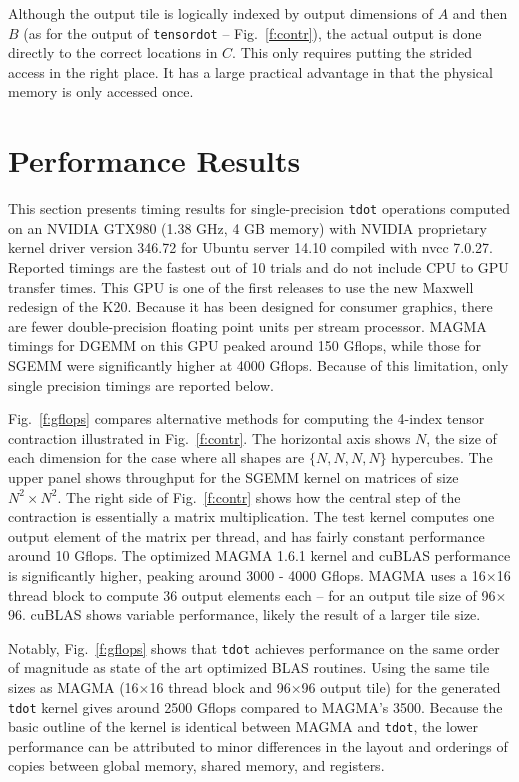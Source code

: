 \documentclass[preprint]{sigplanconf}
\begin{document}
  Although the output tile is logically indexed by output dimensions of
$A$ and then $B$ (as for the output of {\tt tensordot} -- Fig.~\ref{f:contr}),
the actual output is done directly to the correct locations in $C$.
This only requires putting the strided access in the right place.
It has a large practical advantage in that the physical
memory is only accessed once.

\section{ Performance Results}\label{s:perf}

  This section presents timing results for single-precision {\tt tdot} operations computed
on an NVIDIA GTX980 (1.38 GHz, 4 GB memory) with NVIDIA proprietary
kernel driver version 346.72 for Ubuntu server 14.10 compiled with nvcc 7.0.27.  Reported timings
are the fastest out of 10 trials and do not include CPU to GPU transfer times.
This GPU is one of the first releases to use the new Maxwell redesign of
the K20.  Because it has been designed for consumer graphics,
there are fewer double-precision floating point units per stream processor.
MAGMA timings for DGEMM on this GPU peaked around 150 Gflops, while those
for SGEMM were significantly higher at 4000 Gflops.  Because of this limitation,
only single precision timings are reported below.

  Fig.~\ref{f:gflops} compares alternative methods for computing the 4-index
tensor contraction illustrated in Fig.~\ref{f:contr}.  The horizontal
axis shows $N$, the size of each dimension for the case where all shapes are
$\{N,N,N,N\}$ hypercubes.
The upper panel shows throughput for the SGEMM kernel on matrices of size $N^2 \times N^2$.
The right side of Fig.~\ref{f:contr} shows how the central step
of the contraction is essentially a matrix multiplication.  The test kernel
computes one output element of the matrix per thread, and has fairly
constant performance around 10 Gflops.
The optimized MAGMA 1.6.1 kernel and cuBLAS performance is significantly
higher, peaking around 3000 - 4000 Gflops.  MAGMA uses a 16$\times$16 thread
block to compute 36 output elements each -- for an output tile size of 96$\times$96.
cuBLAS shows variable performance, likely the result of a larger tile size.

  Notably, Fig.~\ref{f:gflops} shows that {\tt tdot} achieves performance on the same order
of magnitude as state of the art optimized BLAS routines.
Using the same tile sizes as MAGMA (16$\times$16 thread block and 96$\times$96 output tile)
for the generated {\tt tdot} kernel gives around 2500 Gflops compared to MAGMA's 3500.
Because the basic outline of the kernel is identical between MAGMA and
{\tt tdot}, the lower performance can be attributed to
minor differences in the layout and orderings of copies between global memory,
shared memory, and registers.
\end{document}

